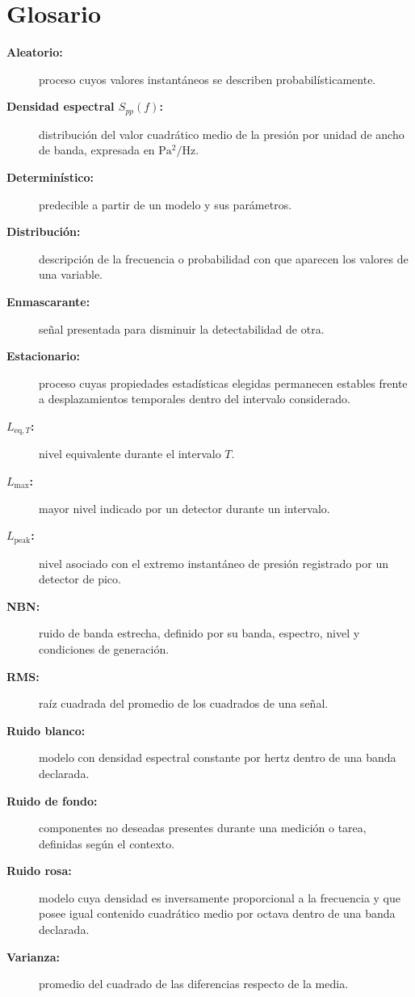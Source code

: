 \section{Glosario}
\label{sec:u10-glosario}
\begin{description}
    \item[\textbf{Aleatorio:}] proceso cuyos valores instantáneos se describen
    probabilísticamente.
    \item[\textbf{Densidad espectral \(S_{pp}(f)\):}] distribución del valor
    cuadrático medio de la presión por unidad de ancho de banda, expresada en
    \(\mathrm{Pa^2/Hz}\).
    \item[\textbf{Determinístico:}] predecible a partir de un modelo y sus
    parámetros.
    \item[\textbf{Distribución:}] descripción de la frecuencia o probabilidad
    con que aparecen los valores de una variable.
    \item[\textbf{Enmascarante:}] señal presentada para disminuir la
    detectabilidad de otra.
    \item[\textbf{Estacionario:}] proceso cuyas propiedades estadísticas
    elegidas permanecen estables frente a desplazamientos temporales dentro
    del intervalo considerado.
    \item[\textbf{\(L_{\mathrm{eq},T}\):}] nivel equivalente durante el
    intervalo \(T\).
    \item[\textbf{\(L_{\mathrm{max}}\):}] mayor nivel indicado por un detector
    durante un intervalo.
    \item[\textbf{\(L_{\mathrm{peak}}\):}] nivel asociado con el extremo
    instantáneo de presión registrado por un detector de pico.
    \item[\textbf{NBN:}] ruido de banda estrecha, definido por su banda,
    espectro, nivel y condiciones de generación.
    \item[\textbf{RMS:}] raíz cuadrada del promedio de los cuadrados de una
    señal.
    \item[\textbf{Ruido blanco:}] modelo con densidad espectral constante por
    hertz dentro de una banda declarada.
    \item[\textbf{Ruido de fondo:}] componentes no deseadas presentes durante
    una medición o tarea, definidas según el contexto.
    \item[\textbf{Ruido rosa:}] modelo cuya densidad es inversamente
    proporcional a la frecuencia y que posee igual contenido cuadrático medio
    por octava dentro de una banda declarada.
    \item[\textbf{Varianza:}] promedio del cuadrado de las diferencias
    respecto de la media.
\end{description}

